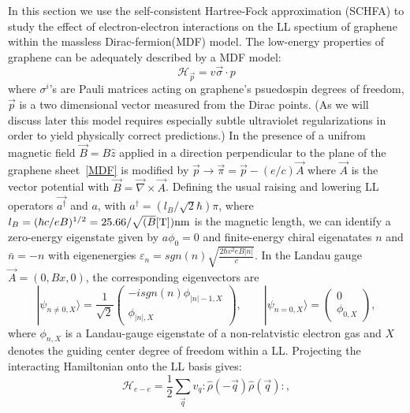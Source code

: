 \documentclass{ws-ijmpb}
\begin{document}
In this section we use the self-consistent Hartree-Fock approximation (SCHFA) to study the 
effect of electron-electron interactions on the LL spectium of graphene within the 
massless Dirac-fermion(MDF) model.  
The low-energy properties of graphene can be adequately described by a MDF model:
\begin{equation}
\label{MDF}
\mathcal{H}_{\vec{p}} = v \vec{\sigma} \cdot p
\end{equation}
where $\sigma^{i}$'s are Pauli matrices acting on graphene's psuedospin degrees of 
freedom, $\vec{p}$ is a two dimensional vector 
measured from the Dirac points.  (As we will discuss later this model requires 
especially subtle ultraviolet regularizations in order to yield physically correct 
predictions.) 
In the presence of a unifrom magnetic field $\vec{B} = 
B \hat{z}$ applied in a 
direction perpendicular to the plane of the graphene sheet~\ref{MDF} is modified by 
 $\vec{p} \to \vec{\pi} = \vec{p} -(e/c)\vec{A}$ where $\vec{A}$ is the vector 
potential with $\vec{B} =\vec{\nabla} \times \vec{A}$. Defining the usual raising and 
lowering LL operators $\vec{a^{\dagger}}$ and $a$, with $a^{\dagger} = 
(l_{B}/\sqrt{2}\hbar) \pi$, where $l_{B} = (\hbar c/eB)^{1/2} = 
25.66/\sqrt{(B}[\rm{T}])\rm{nm}$ is the magnetic length, we can identify a 
zero-energy eigenstate given by $a \phi_{0} = 0$ and finite-energy chiral 
eigenatates $n$ and 
$\bar{n} = -n$ with eigenenergies $\varepsilon_{n} = sgn(n) \sqrt{\frac{2 \hbar v^{2}e 
B |n|}{c}}$.  In the Landau gauge $ \vec{A} = (0,Bx,0 
)$, the corresponding eigenvectors are
\begin{equation}
|\psi_{n \neq 0 , X} \rangle  = \frac{1}{\sqrt{2}}\left(
\begin{array}{c} -i sgn(n) \phi_{|n|-1,X}\\
\phi_{|n|,X} \end{array} \right),
\qquad
|\psi_{n = 0 , X} \rangle  = \left(
\begin{array}{c} 0 \\
\phi_{0,X}\end{array} \right),
\end{equation}
where $\phi_{n,X}$ is a Landau-gauge eigenstate of a non-relatvistic electron gas and 
$X$ denotes the guiding center degree of freedom within a LL.  Projecting the 
interacting Hamiltonian onto the LL basis gives: 
\begin{equation}
\mathcal{H}_{e-e} = \frac{1}{2} \sum_{\vec{q}} v_{q} : \hat{\rho}(-\vec{q}) 
\hat{\rho}(\vec{q}):,
\end{equation}
\end{document}
